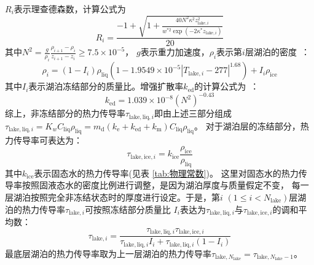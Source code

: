 $R_{i} $表示理查德森数，计算公式为
\begin{equation}
  R_{i}=\frac{-1+\sqrt{\left.1+\frac{40 N^{2} \kappa^{2} z_{\mathrm{lake},i}^{2}}{w^{\ast 2} \exp \left(-2 \kappa^{\ast} z_{\mathrm{lake},i}\right)}\right.}}{20}
\end{equation}
其中$N^2=\frac{g}{\rho_i}\frac{\rho_{i+1}-\rho_i}{z_{i+1}-z_i}\geqslant 7.5\times{10}^{-5}$，
$g$表示重力加速度，$\rho_i$表示第$i$层湖泊的密度~\citep{hostetler1990simulation}：
\begin{equation}\label{rho_i}
  \rho_{i}=\left(1-I_{i}\right) \rho_{\mathrm{liq}}\left(1-1.9549 \times 10^{-5}\left|T_{\mathrm{lake},i}-277\right|^{1.68}\right)+I_{i} \rho_{\mathrm{ice}}
\end{equation}
其中$I_i$表示湖泊冻结部分的质量比。增强扩散率$k_{\mathrm{ed}}$的计算公式为~\citep{fang1996long}：
\begin{equation}
  k_{\mathrm{e d}}=1.039 \times 10^{-8}\left(N^{2}\right)^{-0.43}
\end{equation}
综上，非冻结部分的热力传导率$\tau_{\mathrm{lake,liq},i}$即由上述三部分组成
$\tau_{\mathrm{lake,liq},i}=K_wC_{\mathrm{liq}}\rho_{\mathrm{liq}}=m_{\mathrm {d}} \left(k_{\mathrm {e}} +k_{\mathrm{ed}}+k_{\mathrm {m}} \right)C_{\mathrm{liq}}\rho_{\mathrm{liq}}$。
对于湖泊层的冻结部分，热力传导率可表达为：
\begin{equation}
  \tau_{\mathrm{lake,ice},i}=k_{\mathrm {ice}} \frac{\rho_{\mathrm{ice}}}{\rho_{\mathrm{liq}}}
\end{equation}
其中$k_{\mathrm {ice}}$表示固态水的热力传导率(见表 \ref{tab:物理常数})。
这里对固态水的热力传导率按照固液态水的密度比例进行调整，是因为湖泊厚度与质量假定不变，
每一层湖泊按照完全非冻结状态时的厚度进行设定。于是，第$i$ $\left(1\leqslant i<N_{\mathrm{lake}}\right)$层湖泊的热力传导率$\tau_{\mathrm{lake},i}$可按照冻结部分质量比
$I_i$表达为$\tau_{\mathrm{lake,liq},i}$与$\tau_{\mathrm{lake,ice},i}$的调和平均数：
\begin{equation}
  \tau_{\mathrm{lake},i}=\frac{\tau_{\mathrm{lake,liq},i} \tau_{\mathrm{lake,ice},i}}{\tau_{\mathrm{lake,liq},i} I_{i}+\tau_{\mathrm{lake,liq},i}\left(1-I_{i}\right)}
\end{equation}
最底层湖泊的热力传导率取为上一层湖泊的热力传导率$\tau_{\mathrm{lake},N_{\mathrm{lake}}}=\tau_{\mathrm{lake},N_{\mathrm{lake}}-1}$。


